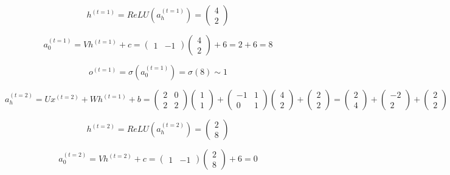 $$ h^{(t=1)} = ReLU \left( a_h^{(t=1)} \right) = \begin{pmatrix} 4 \\ 2 \end{pmatrix} $$

$$ a_0^{(t=1)} = V h^{(t=1)} + c = \begin{pmatrix} 1 & -1 \end{pmatrix} \begin{pmatrix} 4 \\ 2 \end{pmatrix} + 6 = 2 + 6 = 8  $$

$$ o^{(t=1)} = \sigma \left( a_0^{(t=1)}  \right) = \sigma(8) \sim 1 $$

$$ a_h^{(t=2)} = U x^{(t=2)} + W h^{(t=1)} + b = \begin{pmatrix} 2 & 0 \\ 2 & 2 \end{pmatrix} \begin{pmatrix} 1 \\ 1 \end{pmatrix} +  \begin{pmatrix} -1 & 1 \\ 0 & 1 \end{pmatrix} \begin{pmatrix} 4 \\ 2 \end{pmatrix}  + \begin{pmatrix} 2 \\ 2 \end{pmatrix} = \begin{pmatrix} 2 \\ 4 \end{pmatrix} +  \begin{pmatrix} -2 \\ 2 \end{pmatrix} + \begin{pmatrix} 2 \\ 2 \end{pmatrix} = \begin{pmatrix} 2 \\ 8 \end{pmatrix}    $$

$$ h^{(t=2)} = ReLU \left( a_h^{(t=2)} \right) = \begin{pmatrix} 2 \\ 8 \end{pmatrix} $$

$$ a_0^{(t=2)} = V h^{(t=2)} + c = \begin{pmatrix} 1 & -1 \end{pmatrix} \begin{pmatrix} 2 \\ 8 \end{pmatrix} + 6 = 0 $$

